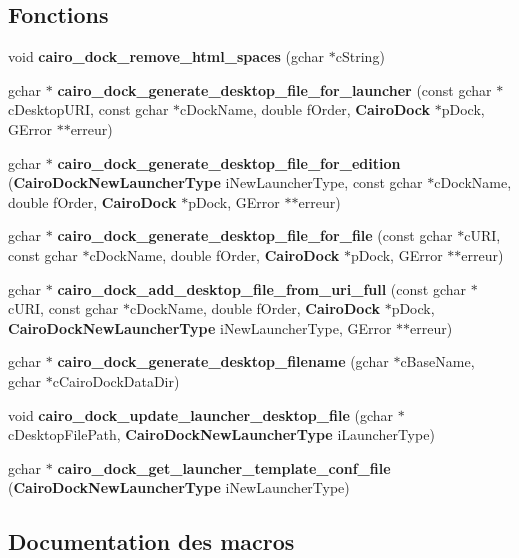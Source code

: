 \subsection*{Fonctions}
\begin{CompactItemize}
\item 
void {\bf cairo\_\-dock\_\-remove\_\-html\_\-spaces} (gchar $\ast$cString)
\item 
gchar $\ast$ {\bf cairo\_\-dock\_\-generate\_\-desktop\_\-file\_\-for\_\-launcher} (const gchar $\ast$cDesktopURI, const gchar $\ast$cDockName, double fOrder, {\bf CairoDock} $\ast$pDock, GError $\ast$$\ast$erreur)
\item 
gchar $\ast$ {\bf cairo\_\-dock\_\-generate\_\-desktop\_\-file\_\-for\_\-edition} ({\bf CairoDockNewLauncherType} iNewLauncherType, const gchar $\ast$cDockName, double fOrder, {\bf CairoDock} $\ast$pDock, GError $\ast$$\ast$erreur)
\item 
gchar $\ast$ {\bf cairo\_\-dock\_\-generate\_\-desktop\_\-file\_\-for\_\-file} (const gchar $\ast$cURI, const gchar $\ast$cDockName, double fOrder, {\bf CairoDock} $\ast$pDock, GError $\ast$$\ast$erreur)
\item 
gchar $\ast$ {\bf cairo\_\-dock\_\-add\_\-desktop\_\-file\_\-from\_\-uri\_\-full} (const gchar $\ast$cURI, const gchar $\ast$cDockName, double fOrder, {\bf CairoDock} $\ast$pDock, {\bf CairoDockNewLauncherType} iNewLauncherType, GError $\ast$$\ast$erreur)
\item 
gchar $\ast$ {\bf cairo\_\-dock\_\-generate\_\-desktop\_\-filename} (gchar $\ast$cBaseName, gchar $\ast$cCairoDockDataDir)
\item 
void {\bf cairo\_\-dock\_\-update\_\-launcher\_\-desktop\_\-file} (gchar $\ast$cDesktopFilePath, {\bf CairoDockNewLauncherType} iLauncherType)
\item 
gchar $\ast$ {\bf cairo\_\-dock\_\-get\_\-launcher\_\-template\_\-conf\_\-file} ({\bf CairoDockNewLauncherType} iNewLauncherType)
\end{CompactItemize}


\subsection{Documentation des macros}
